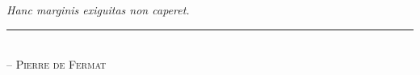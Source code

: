 \chapter*{~}


\begin{center}                      %
\vspace*{2.5in}                     %
\begin{onehalfspacing}
    \textit{
    Hanc marginis exiguitas non caperet.
    } \\
    
    \rule{1.5in}{0.5pt} \\          %
    
    \textsc{-- Pierre de Fermat}
\end{onehalfspacing}
\end{center}